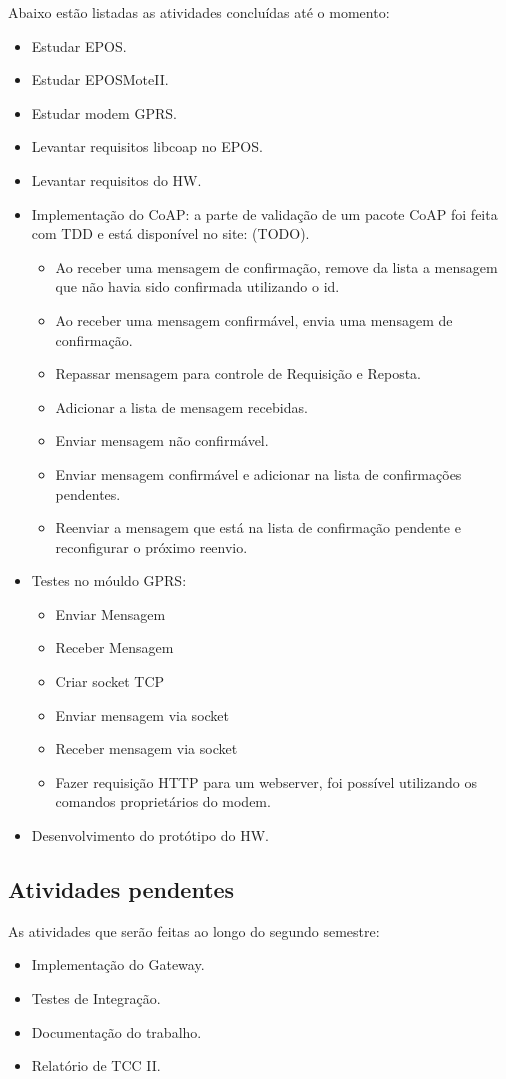 Abaixo est\~ao listadas as atividades conclu\'idas at\'e o momento:
\begin{itemize}
    \item Estudar EPOS.
    \item Estudar EPOSMoteII.
    \item Estudar modem GPRS.
    \item Levantar requisitos libcoap no EPOS.
    \item Levantar requisitos do HW.
    \item Implementa\c{c}\~ao do CoAP: a parte de valida\c{c}\~ao de um pacote CoAP foi feita com TDD e est\'a dispon\'ivel no site: (TODO).
    \begin{itemize}[noitemsep,topsep=0pt,parsep=0pt,partopsep=0pt]
        \item Ao receber uma mensagem de confirma\c{c}\~ao, remove da lista a mensagem que n\~ao havia sido confirmada utilizando o id.
        \item Ao receber uma mensagem confirm\'avel, envia uma mensagem de confirma\c{c}\~ao.
        \item Repassar mensagem para controle de Requisi\c{c}\~ao e Reposta.
        \item Adicionar a lista de mensagem recebidas.
        \item Enviar mensagem n\~ao confirm\'avel.
        \item Enviar mensagem confirm\'avel e adicionar na lista de confirma\c{c}\~oes pendentes.
        \item Reenviar a mensagem que est\'a na lista de confirma\c{c}\~ao pendente e reconfigurar o pr\'oximo reenvio.
    \end{itemize}
    
    \item Testes no m\'ouldo GPRS:
        \begin{itemize}[noitemsep,topsep=0pt,parsep=0pt,partopsep=0pt]
            \item Enviar Mensagem
            \item Receber Mensagem
            \item Criar socket TCP
            \item Enviar mensagem via socket
            \item Receber mensagem via socket
            \item Fazer requisi\c{c}\~ao HTTP para um webserver, foi poss\'ivel utilizando os comandos propriet\'arios do modem.
        \end{itemize}
    \item Desenvolvimento do prot\'otipo do HW.
\end{itemize}

\subsection{Atividades pendentes}
As atividades que ser\~ao feitas ao longo do segundo semestre:
\begin{itemize}
    \item Implementa\c{c}\~ao do Gateway.
    \item Testes de Integra\c{c}\~ao.
    \item Documenta\c{c}\~ao do trabalho.
    \item Relat\'orio de TCC II.
\end{itemize}
